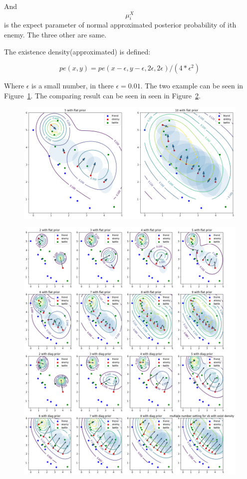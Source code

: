 \documentclass{article}
\begin{document}
And $$\mu^X_i$$ is the expect parameter of normal approximated posterior probability of ith enemy.
The three other are same.

The existence density(approximated) is defined:

$$
pe(x,y) = pe(x-\epsilon,y-\epsilon,2\epsilon,2\epsilon)/(4*\epsilon^2)
$$

Where $\epsilon$ is a small number, in there $\epsilon=0.01$. 
The two example can be seen in Figure~\ref{fig:existDensity}. 
The comparing result can be seen in seen in Figure~\ref{fig:bigVbExist}.

\begin{figure}[h!]
\includegraphics[width=0.99\linewidth]{exist_density.png}
\label{fig:existDensity}
\end{figure}


\begin{figure}[h!]
\includegraphics[width=0.99\linewidth]{big_vb_exist_prob.png}
\label{fig:bigVbExist}
\end{figure}
\end{document}
